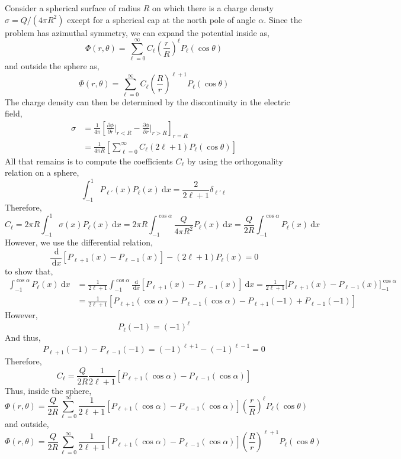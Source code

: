 \documentclass[12pt]{extarticle}
\renewcommand{\d}[1]{\: \mathrm{d}#1}
\newcommand{\deriv}[2]{\frac{\d{#1}}{\d{#2}}}
\newcommand{\pderiv}[2]{\frac{\partial{#1}}{\partial{#2}}}
\theoremstyle{definition}
\begin{document}
Consider a spherical surface of radius $R$ on which there is a charge densty $\sigma = Q / (4 \pi R^2)$ except for a spherical cap at the north pole of angle $\alpha$. Since the problem has azimuthal symmetry, we can expand the potential inside as,
\[ \Phi(r, \theta) = \sum_{\ell = 0}^\infty C_{\ell} \left( \frac{r}{R} \right)^{\ell} P_{\ell}(\cos{\theta}) \]
and outside the sphere as,
\[ \Phi(r, \theta) = \sum_{\ell = 0}^\infty C_{\ell} \left( \frac{R}{r} \right)^{\ell+1} P_{\ell}(\cos{\theta}) \]
The charge density can then be determined by the discontinuity in the electric field,
\begin{align*}
\sigma & = \frac{1}{4 \pi} \left[ \pderiv{\phi}{r} \bigg|_{r < R} - \pderiv{\phi}{r} \bigg|_{r > R} \right]_{r = R}
\\
& = \frac{1}{4 \pi R} \left[ \sum_{\ell = 0}^\infty C_{\ell} (2 \ell + 1) P_{\ell}(\cos{\theta}) \right]
\end{align*}
All that remains is to compute the coefficients $C_{\ell}$ by using the orthogonality relation on a sphere,
\[ \int_{-1}^1 P_{\ell'}(x) P_{\ell}(x) \d{x} = \frac{2}{2 \ell + 1} \delta_{\ell' \ell} \]
Therefore,
\[ C_{\ell} = 2 \pi R \int_{-1}^{1} \sigma(x) P_{\ell}(x) \d{x} = 2 \pi R  \int_{-1}^{\cos{\alpha}} \frac{Q}{4 \pi R^2} P_{\ell}(x) \d{x} = \frac{Q}{2 R} \int_{-1}^{\cos{\alpha}} P_{\ell}(x) \d{x} \]
However, we use the differential relation,
\[ \deriv{}{x} \left[ P_{\ell + 1}(x) - P_{\ell - 1}(x) \right] - (2 \ell + 1) P_{\ell}(x) = 0\]
to show that,
\begin{align*}
\int_{-1}^{\cos{\alpha}} P_{\ell}(x) \d{x} & = \frac{1}{2 \ell + 1} \int_{-1}^{\cos{\alpha}}  \deriv{}{x} \left[ P_{\ell + 1}(x) - P_{\ell - 1}(x) \right] \d{x} = \frac{1}{2 \ell + 1} \Big[ P_{\ell + 1}(x) - P_{\ell - 1}(x) \Big]^{\cos{\alpha}}_{-1}
\\
& = \frac{1}{2 \ell + 1} \left[ P_{\ell + 1}(\cos{\alpha}) - P_{\ell - 1}(\cos{\alpha}) - P_{\ell+1}(-1) + P_{\ell-1}(-1) \right] 
\end{align*}
However,
\[ P_{\ell}(-1) = (-1)^{\ell} \]
And thus,
\[ P_{\ell+1}(-1) - P_{\ell-1}(-1) = (-1)^{\ell + 1} - (-1)^{\ell - 1} = 0 \]
Therefore,
\[ C_{\ell} = \frac{Q}{2 R} \frac{1}{2 \ell + 1} \left[ P_{\ell + 1}(\cos{\alpha}) - P_{\ell - 1}(\cos{\alpha}) \right] \]
Thus, inside the sphere,
\[ \Phi(r, \theta) = \frac{Q}{2 R} \sum_{\ell = 0}^\infty \frac{1}{2  \ell + 1} \left[ P_{\ell + 1}(\cos{\alpha}) - P_{\ell - 1}(\cos{\alpha}) \right]  \left( \frac{r}{R} \right)^{\ell} P_{\ell}(\cos{\theta}) \]
and outside,
\[ \Phi(r, \theta) = \frac{Q}{2 R} \sum_{\ell = 0}^\infty \frac{1}{2  \ell + 1} \left[ P_{\ell + 1}(\cos{\alpha}) - P_{\ell - 1}(\cos{\alpha}) \right]  \left( \frac{R}{r} \right)^{\ell+1} P_{\ell}(\cos{\theta}) \]
\end{document}
